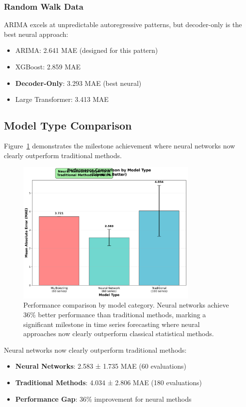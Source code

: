 \documentclass[11pt]{article}
\begin{document}
\subsubsection{Random Walk Data}

ARIMA excels at unpredictable autoregressive patterns, but decoder-only is the best neural approach:

\begin{itemize}
\item ARIMA: 2.641 MAE (designed for this pattern)
\item XGBoost: 2.859 MAE
\item \textbf{Decoder-Only}: 3.293 MAE (best neural)
\item Large Transformer: 3.413 MAE
\end{itemize}

\subsection{Model Type Comparison}

Figure~\ref{fig:model_type} demonstrates the milestone achievement where neural networks now clearly outperform traditional methods.

\begin{figure}[h]
\centering
\includegraphics[width=0.8\textwidth]{results/figure4_model_type_comparison.png}
\caption{Performance comparison by model category. Neural networks achieve 36\% better performance than traditional methods, marking a significant milestone in time series forecasting where neural approaches now clearly outperform classical statistical methods.}
\label{fig:model_type}
\end{figure}

Neural networks now clearly outperform traditional methods:
\begin{itemize}
\item \textbf{Neural Networks}: 2.583 ± 1.735 MAE (60 evaluations)
\item \textbf{Traditional Methods}: 4.034 ± 2.806 MAE (180 evaluations)
\item \textbf{Performance Gap}: 36\% improvement for neural methods
\end{itemize}
\end{document}

